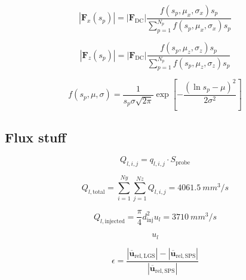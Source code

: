 \begin{equation}
|\textbf{F}_x \left( s_p \right) |  = |\textbf{F}_\mathrm{DC}| \frac{f \left( s_p, \mu_x, \sigma_x \right) s_p}{\sum_{p=1}^{N_p} f \left( s_p, \mu_x, \sigma_x \right) s_p}
\end{equation}

\begin{equation}
|\textbf{F}_z \left( s_p \right) |  = |\textbf{F}_\mathrm{DC}| \frac{f \left( s_p, \mu_z, \sigma_z \right) s_p}{\sum_{p=1}^{N_p} f \left( s_p, \mu_z, \sigma_z \right) s_p}
\end{equation}

\begin{equation}
 f \left( s_p, \mu, \sigma \right) = \frac{1}{s_p \sigma \sqrt{2 \pi }} \exp \left[ - \frac{ \left( \ln s_p - \mu \right)^2}{2 \sigma^2} \right]
\end{equation}

	
\subsection*{Flux stuff}

\begin{equation}
Q_{l,i,j} =  q_{l,i,j} \cdot S_\mathrm{probe}
\end{equation}

\begin{equation}
Q_{l,\mathrm{total}} = \sum_{i=1}^{Ny} \sum_{j=1}^{Nz} Q_{l,i,j} = 4061.5~mm^3/s
\end{equation}

\begin{equation}
Q_{l,\mathrm{injected}} = \frac{\pi}{4} d_\mathrm{inj}^2 u_l = 3710~mm^3/s
\end{equation}

\begin{equation}
u_l
\end{equation}

\begin{equation}
\epsilon = \frac{|\overline{\textbf{u}}_\mathrm{rel,LGS}| - |\overline{\textbf{u}}_\mathrm{rel,SPS}|}{|\overline{\textbf{u}}_\mathrm{rel,SPS}|}
\end{equation}